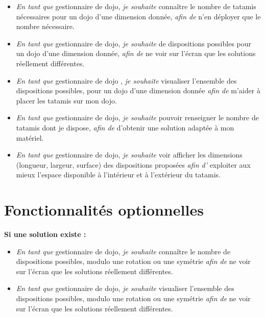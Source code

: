 \begin{itemize}
    \item \emph{En tant que} gestionnaire de dojo, 
    \emph{ je souhaite} connaître le nombre de tatamis nécessaires pour un dojo d'une dimension donnée,
    \emph{afin de } n’en déployer que le nombre nécessaire.
    \item \emph{En tant que} gestionnaire de dojo,
    \emph{ je souhaite} de dispositions possibles pour un dojo d'une dimension donnée, 
    \emph{ afin de } ne voir sur l’écran que les solutions réellement différentes.
    \item \emph{En tant que} gestionnaire de dojo ,
    \emph{ je souhaite} visualiser l'ensemble des dispositions possibles, pour un dojo d'une dimension donnée
    \emph{afin de } m’aider à placer les tatamis sur mon dojo.
    \item \emph{En tant que} gestionnaire de dojo, 
    \emph{ je souhaite} pouvoir renseigner le nombre de tatamis dont je dispose, 
    \emph{afin de } d'obtenir une solution adaptée à mon matériel.
    \item \emph{En tant que} gestionnaire de dojo,
    \emph{ je souhaite} voir afficher les dimensions (longueur, largeur, surface) des dispositions proposées  
    \emph{ afin d' }exploiter aux mieux l'espace disponible à l'intérieur et à l'extérieur du tatamis.
\end{itemize}


\section{Fonctionnalités optionnelles}

\textbf{ Si une solution existe :}
\begin{itemize}
    \item \emph{En tant que} gestionnaire de dojo, 
    \emph{ je souhaite} connaître le nombre de dispositions possibles, modulo une rotation ou une symétrie 
    \emph{ afin de } ne voir sur l’écran que les solutions réellement différentes.
    \item \emph{En tant que} gestionnaire de dojo, 
    \emph{ je souhaite} visualiser l’ensemble des dispositions possibles, modulo une rotation ou une symétrie 
    \emph{ afin de } ne voir sur l’écran que les solutions réellement différentes.
\end{itemize}

